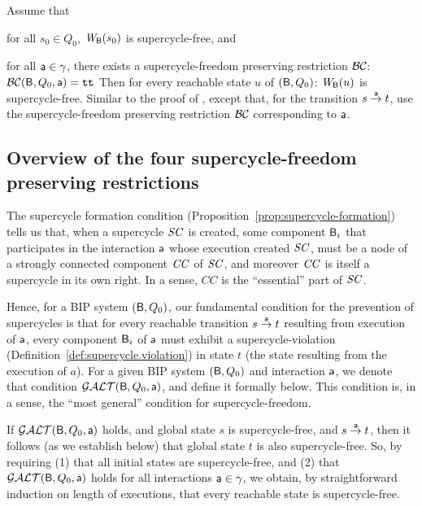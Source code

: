 
\label{cor:SC-free-preserving.deadlock-free}
Assume that
\bn
\item \label{cor:SC-free-preserving.initial}
      for all $s_0 \in Q_0$, $\wfg{\B}{s_0}$ is supercycle-free, and
\item \label{cor:SC-free-preserving.reachable-transitions}
   for all $\act \in \gamma$, there exists a supercycle-freedom preserving restriction $\BC$: $\BC(\B, Q_0, \act) = \ttt$ 
\en
Then for every reachable state $u$ of $(\B, Q_0)$:  $\wfg{\B}{u}$ is supercycle-free.
\eco
%
\bpr
Similar to the proof of ,  except that, for
the transition $s \la{\act} t$, use the  supercycle-freedom preserving restriction $\BC$
corresponding to $\act$.
\epr


\subsection{Overview of the four supercycle-freedom preserving restrictions}

The supercycle formation condition
(Proposition~\ref{prop:supercycle-formation}) tells us that, when a
supercycle $\SC$ is created, some component $\B_i$ that participates
in the interaction $\act$ whose execution created $\SC$, must be a
node of a strongly connected component $\CC$ of $\SC$, and moreover
$\CC$ is itself a supercycle in its own right. In a sense, $CC$ is the
``essential'' part of $\SC$.

Hence, for a BIP system $(\B, Q_0)$, our fundamental condition for the
prevention of supercycles is that for every reachable transition
$s \goesto[\act] t$ resulting from execution of $\act$, every
component $\B_i$ of $\act$ must exhibit a supercycle-violation
(Definition~\ref{def:supercycle.violation}) in state $t$ (the state
resulting from the execution of $a$). For a given BIP system
$(\B, Q_0)$ and interaction $\act$, we denote that condition
$\GAO(\B, Q_0, \act)$, and define it formally below.  This condition
is, in a sense, the ``most general'' condition for supercycle-freedom.

If $\GAO(\B, Q_0, \act)$ holds, and global state $s$ is
supercycle-free, and $s \goesto[\act] t$, then it follows (as we
establish below) that global state $t$ is also supercycle-free.  So,
by requiring (1) that all initial states are supercycle-free, and (2)
that $\GAO(\B, Q_0, \act)$ holds for all interactions
$\act \in \gamma$, we obtain, by straightforward induction on length
of executions, that every reachable state is supercycle-free.

